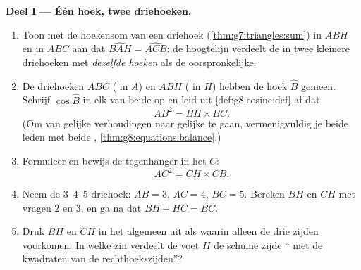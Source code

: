 \begin{problem}[{Weekendopgave --- de hoogtelijn van een rechthoekige driehoek:
$AB^2 = BH \times BC$, $AH^2 = BH \times HC$, een tweede bewijs van Pythagoras,
en een machine om vierkantswortels te construeren}]
\medskip
\noindent\textbf{Deel I --- Één hoek, twee driehoeken.}
\begin{enumerate}
  \item Toon met de hoekensom van een driehoek (\cref{thm:g7:triangles:sum}) in
        $ABH$ en in $ABC$ aan dat $\widehat{BAH} = \widehat{ACB}$: de hoogtelijn
        verdeelt de  in twee kleinere driehoeken met
        \emph{dezelfde hoeken} als de oorspronkelijke.
  \item De driehoeken $ABC$ ( in $A$) en $ABH$ ( in $H$)
        hebben de hoek $\widehat B$ gemeen. Schrijf $\cos\widehat B$ in elk van
        beide op en leid uit \cref{def:g8:cosine:def} af dat
        \[
        AB^2 = BH \times BC .
        \]
        (Om van gelijke verhoudingen naar gelijke  te gaan,
        vermenigvuldig je beide leden met beide ,
        \cref{thm:g8:equations:balance}.)
  \item Formuleer en bewijs de tegenhanger in het  $C$:
        \[
        AC^2 = CH \times CB .
        \]
  \item Neem de $3$--$4$--$5$-driehoek: $AB = 3$, $AC = 4$, $BC = 5$. Bereken
        $BH$ en $CH$ met vragen 2 en 3, en ga na dat $BH + HC = BC$.
  \item Druk $BH$ en $CH$ in het algemeen uit als  waarin alleen de drie
        zijden voorkomen. In welke zin verdeelt de voet $H$ de schuine zijde
        `` met de kwadraten van de rechthoekszijden''?
\end{enumerate}


\end{problem}
